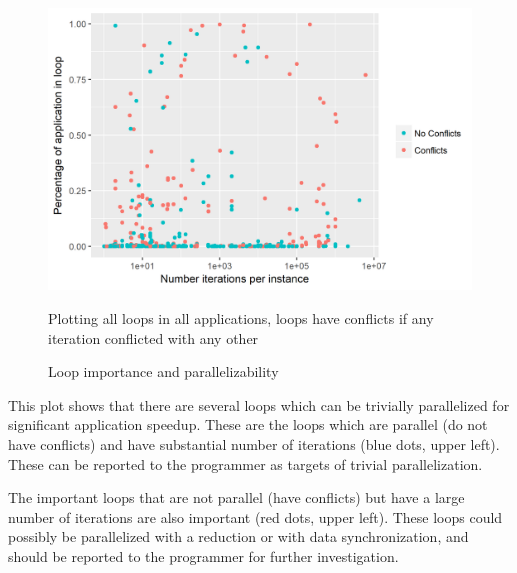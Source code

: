 \documentclass[12pt,twoside]{reedthesis}
\begin{document}
		
		\begin{figure}
			\caption{Loop importance and parallelizability}
			\label{fig:size-iteration-plots}
			
			\begin{minipage}{0.73\textwidth} %
				\includegraphics[scale=0.7]{plots/size_iteration_plot.png}
				{\footnotesize Plotting all loops in all applications, loops have conflicts if any iteration conflicted with any other\par}
			\end{minipage}
		\end{figure}
		
		This plot shows that there are several loops which can be trivially parallelized for significant application speedup. 
		These are the loops which are parallel (do not have conflicts) and have substantial number of iterations (blue dots, upper left). These can be reported to the programmer as targets of trivial parallelization. 
		
		The important loops that are not parallel (have conflicts) but have a large number of iterations are also important (red dots, upper left). These loops could possibly be parallelized with a reduction or with data synchronization, and should be reported to the programmer for further investigation.
		
\end{document}
